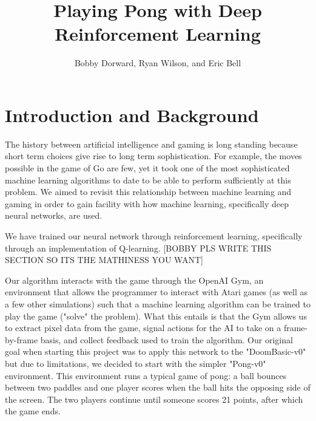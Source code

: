 \documentclass[12pt]{article}
\theoremstyle{plain}
\theoremstyle{definition}
\theoremstyle{remark}
\theoremstyle{plain}
\begin{document}
\title{Playing Pong with Deep Reinforcement Learning}
\author{Bobby Dorward, Ryan Wilson, and Eric Bell}
\maketitle

\section{Introduction and Background}
\par 
The history between artificial intelligence and gaming is long standing because short term choices give rise to long term sophistication.  For example, the moves possible in the game of Go are few, yet it took one of the most sophisticated machine learning algorithms to date to be able to perform sufficiently at this problem.  We aimed to revisit this relationship between machine learning and gaming in order to gain  facility with how machine learning, specifically deep neural networks, are used.
\par
We have trained our neural network through reinforcement learning, specifically through an implementation of Q-learning. [BOBBY PLS WRITE THIS SECTION SO ITS THE MATHINESS YOU WANT]
\par
Our algorithm interacts with the game through the OpenAI Gym, an environment that allows the programmer to interact with Atari games (as well as a few other simulations) such that a machine learning algorithm can be trained to play the game ("solve" the problem).  What this entails is that the Gym allows us to extract pixel data from the game, signal actions for the AI to take on a frame-by-frame basis, and collect feedback used to train the algorithm.  Our original goal when starting this project was to apply this network to the "DoomBasic-v0" but due to limitations, we decided to start with the simpler "Pong-v0" environment.  This environment runs a typical game of pong: a ball bounces between two paddles and one player scores when the ball hits the opposing side of the screen.  The two players continue until someone scores 21 points, after which the game ends.
\end{document}

